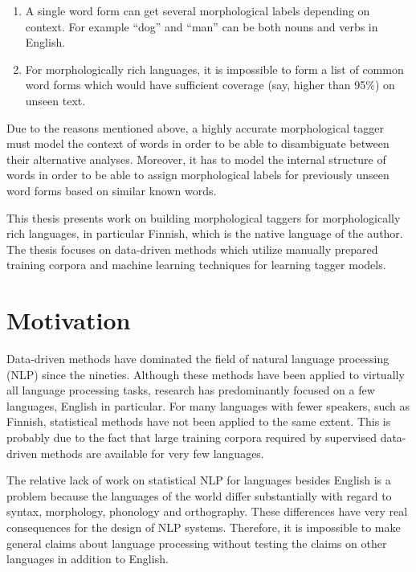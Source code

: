 \begin{enumerate}
\item A single word form can get several morphological labels
  depending on context. For example ``dog'' and ``man'' can be both
  nouns and verbs in English.
\item For morphologically rich languages, it is impossible to form a
  list of common word forms which would have sufficient coverage (say,
  higher than 95\%) on unseen text.
\end{enumerate}

Due to the reasons mentioned above, a highly accurate morphological
tagger must model the context of words in order to be able to
disambiguate between their alternative analyses. Moreover, it has to
model the internal structure of words in order to be able to assign
morphological labels for previously unseen word forms based on similar
known words.

This thesis presents work on building morphological taggers for
morphologically rich languages, in particular Finnish, which is the
native language of the author. The thesis focuses on data-driven
methods which utilize manually prepared training corpora and machine
learning techniques for learning tagger models.

\section{Motivation}
Data-driven methods have dominated the field of natural language
processing (NLP) since the nineties. Although these methods have been
applied to virtually all language processing tasks, research has
predominantly focused on a few languages, English in particular. For
many languages with fewer speakers, such as Finnish, statistical
methods have not been applied to the same extent. This is probably due
to the fact that large training corpora required by supervised
data-driven methods are available for very few languages.

The relative lack of work on statistical NLP for languages besides English is a
problem because the languages of the world differ substantially with
regard to syntax, morphology, phonology and orthography. These
differences have very real consequences for the design of NLP
systems. Therefore, it is impossible to make general claims about
language processing without testing the claims on other languages
in addition to English.

